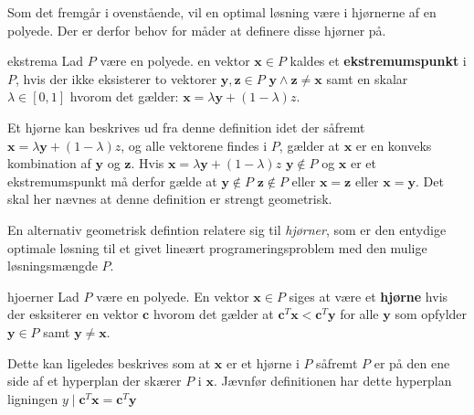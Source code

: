 Som det fremgår i ovenstående, vil en optimal løsning være i hjørnerne af en polyede.
Der er derfor behov for måder at definere disse hjørner på.

\begin{defn}{}{ekstrema}
Lad $P$ være en polyede. en vektor $\mathbf{x} \in P$ kaldes et \textbf{ekstremumspunkt} i $P$, hvis der ikke eksisterer to vektorer $\mathbf{y},\mathbf{z} \in P$ $\mathbf{y} \land \mathbf{z} \neq \mathbf{x}$ samt en skalar $\lambda \in [0,1]$ hvorom det gælder: $\mathbf{x}=\lambda\mathbf{y}+(1-\lambda)z$.
\end{defn}
Et hjørne kan beskrives ud fra denne definition idet der såfremt $\mathbf{x}=\lambda\mathbf{y}+(1-\lambda)z$, og alle vektorene findes i $P$, gælder at $\mathbf{x}$ er en konveks kombination af $\mathbf{y}$ og $\mathbf{z}$.
Hvis $\mathbf{x}=\lambda\mathbf{y}+(1-\lambda)z$ $\mathbf{y}\notin P$ og $\mathbf{x}$ er et ekstremumspunkt må derfor gælde at $\mathbf{y}\notin P$ $\mathbf{z}\notin P$ eller $\mathbf{x}=\mathbf{z}$ eller $\mathbf{x}=\mathbf{y}$. 
Det skal her nævnes at denne definition er strengt geometrisk.



En alternativ geometrisk defintion relatere sig til \textit{hjørner}, som er den entydige optimale løsning til et givet lineært programeringsproblem med den mulige løsningsmængde $P$.
\begin{defn}{}{hjoerner}
Lad $P$ være en polyede. En vektor $\mathbf{x}\in P$ siges at være et \textbf{hjørne} hvis der esksiterer en vektor $\mathbf{c}$ hvorom det gælder at $\mathbf{c}^T\mathbf{x}<\mathbf{c}^T\mathbf{y}$ for alle $\mathbf{y}$ som opfylder $\mathbf{y} \in P$ samt $\mathbf{y}\neq\mathbf{x}$.
\end{defn}
Dette kan ligeledes beskrives som at $\mathbf{x}$ er et hjørne i $P$ såfremt $P$ er på den ene side af et hyperplan der skærer $P$ i $\mathbf{x}$. Jævnfør definitionen har dette hyperplan ligningen $y \mid \mathbf{c}^T\mathbf{x}=\mathbf{c}^T\mathbf{y}$